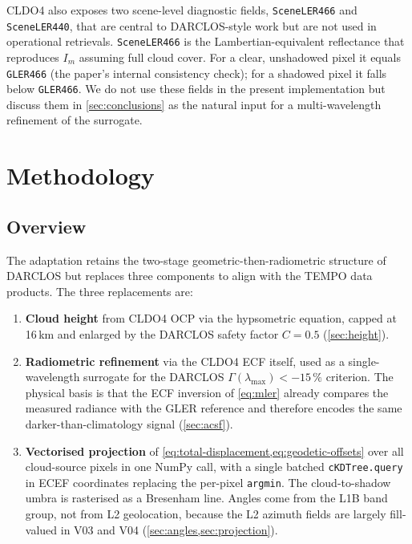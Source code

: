 \documentclass[11pt,a4paper]{article}
\newcommand{\code}[1]{\texttt{#1}}
\begin{document}
CLDO4 also exposes two scene-level diagnostic fields, \code{SceneLER466}
and \code{SceneLER440}, that are central to DARCLOS-style work but are
not used in operational retrievals. \code{SceneLER466} is the
Lambertian-equivalent reflectance that reproduces $I_m$ assuming full
cloud cover. For a clear, unshadowed pixel it equals \code{GLER466}
(the paper's internal consistency check); for a shadowed pixel it falls
below \code{GLER466}. We do not use these fields in the present
implementation but discuss them in \cref{sec:conclusions} as the natural
input for a multi-wavelength refinement of the surrogate.

\section{Methodology}\label{sec:methodology}

\subsection{Overview}\label{sec:overview}

The adaptation retains the two-stage geometric-then-radiometric structure
of DARCLOS but replaces three components to align with the TEMPO data
products. The three replacements are:

\begin{enumerate}
  \item \textbf{Cloud height} from CLDO4 OCP via the hypsometric equation,
        capped at 16\,km and enlarged by the DARCLOS safety factor
        $C = 0.5$ (\cref{sec:height}).
  \item \textbf{Radiometric refinement} via the CLDO4 ECF itself, used as
        a single-wavelength surrogate for the DARCLOS
        $\Gamma(\lambda_{\max}) < -15\,\%$ criterion. The physical basis
        is that the ECF inversion of \cref{eq:mler} already compares the
        measured radiance with the GLER reference and therefore encodes
        the same darker-than-climatology signal (\cref{sec:acsf}).
  \item \textbf{Vectorised projection} of \cref{eq:total-displacement,eq:geodetic-offsets}
        over all cloud-source pixels in one NumPy call, with a single
        batched \code{cKDTree.query} in ECEF coordinates replacing the
        per-pixel \code{argmin}. The cloud-to-shadow umbra is rasterised
        as a Bresenham line. Angles come from the L1B band group, not
        from L2 geolocation, because the L2 azimuth fields are largely
        fill-valued in V03 and V04 (\cref{sec:angles,sec:projection}).
\end{enumerate}
\end{document}
